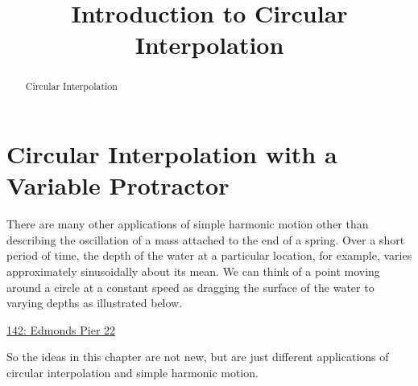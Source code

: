 \documentclass{ximera}
\title{Introduction to Circular Interpolation}
\begin{document}
\begin{abstract}
Circular Interpolation
\end{abstract}
\maketitle

\section{Circular Interpolation with a Variable Protractor}

There are many other applications of simple harmonic motion other than describing the oscillation of a mass attached to the end of a spring. Over a short period of time, the depth of the water at a particular location, for example, varies approximately sinusoidally about its mean. We can think of a point moving around a circle at a constant speed as dragging the surface of the water to varying depths as illustrated below.  

\begin{onlineOnly}
    \begin{center}
\end{center}
\end{onlineOnly}

\href{https://www.desmos.com/calculator/enxgzmsxri}{142: Edmonds Pier 22}

So the ideas in this chapter are not new, but are just different applications of circular interpolation and simple harmonic motion.
\end{document}
